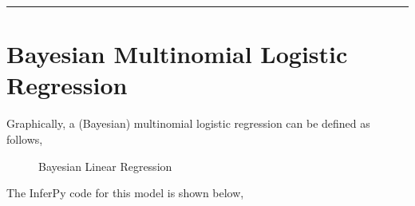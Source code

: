 \documentclass[letterpaper,10pt,english]{sphinxmanual}
\begin{document}
\bigskip\hrule\bigskip



\section{Bayesian Multinomial Logistic Regression}
\label{\detokenize{notes/probzoo:bayesian-multinomial-logistic-regression}}
Graphically, a (Bayesian) multinomial logistic regression can be defined as follows,

\begin{figure}[htbp]
\centering
\capstart

\noindent{}
\caption{Bayesian Linear Regression}\label{\detokenize{notes/probzoo:id3}}\end{figure}

The InferPy code for this model is shown below,
\end{document}
